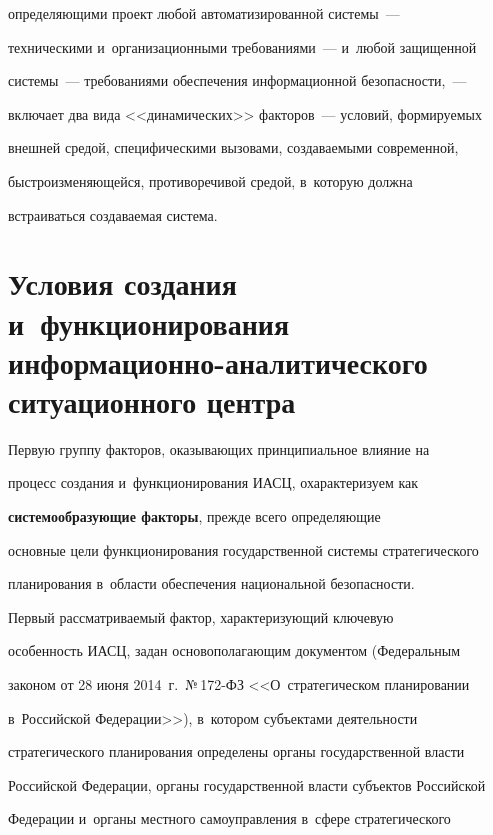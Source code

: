 определяющими проект любой автоматизированной системы~--- 


техническими и~организационными требованиями~--- и~любой защищенной 


системы~--- требованиями обеспечения информационной безопас\-ности,~--- 


включает два вида <<динамических>> факторов~--- условий, формируемых 


внешней средой, специфическими вызовами, создаваемыми современной, 


быстроизменяющейся, противоречивой средой, в~которую должна 


встраиваться создаваемая система.


     


\section{Условия создания и~функционирования информационно-аналитического ситуационного центра}


     


     Первую группу факторов, оказывающих принципиальное влияние на 


процесс создания и~функционирования ИАСЦ, охарактеризуем как 


\textbf{сис\-те\-мо\-об\-ра\-зу\-ющие факторы}, прежде всего определяющие 


основные цели функционирования государственной системы стратегического 


планирования в~об\-ласти обеспечения национальной без\-опас\-ности.


     


     Первый рассматриваемый фактор, характеризующий ключевую 


особенность ИАСЦ, задан основополагающим документом (Федеральным 


законом от 28 июня 2014~г.\ №\,172-ФЗ <<О~стратегическом планировании 


в~Российской Федерации>>), в~котором субъектами деятельности 


стратегического планирования определены органы государственной власти 


Российской Федерации, органы государственной власти субъектов Российской 


Федерации и~органы местного самоуправления в~сфере стратегического 


